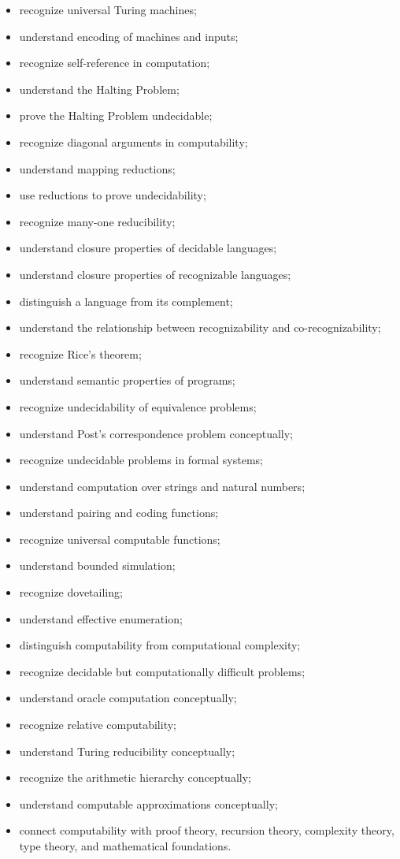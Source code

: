 {\begin{itemize}
    \item recognize universal Turing machines;
    \item understand encoding of machines and inputs;
    \item recognize self-reference in computation;
    \item understand the Halting Problem;
    \item prove the Halting Problem undecidable;
    \item recognize diagonal arguments in computability;
    \item understand mapping reductions;
    \item use reductions to prove undecidability;
    \item recognize many-one reducibility;
    \item understand closure properties of decidable languages;
    \item understand closure properties of recognizable languages;
    \item distinguish a language from its complement;
    \item understand the relationship between recognizability and
          co-recognizability;
    \item recognize Rice's theorem;
    \item understand semantic properties of programs;
    \item recognize undecidability of equivalence problems;
    \item understand Post's correspondence problem conceptually;
    \item recognize undecidable problems in formal systems;
    \item understand computation over strings and natural numbers;
    \item understand pairing and coding functions;
    \item recognize universal computable functions;
    \item understand bounded simulation;
    \item recognize dovetailing;
    \item understand effective enumeration;
    \item distinguish computability from computational complexity;
    \item recognize decidable but computationally difficult problems;
    \item understand oracle computation conceptually;
    \item recognize relative computability;
    \item understand Turing reducibility conceptually;
    \item recognize the arithmetic hierarchy conceptually;
    \item understand computable approximations conceptually;
    \item connect computability with proof theory, recursion theory,
          complexity theory, type theory, and mathematical foundations.
\end{itemize}
}

